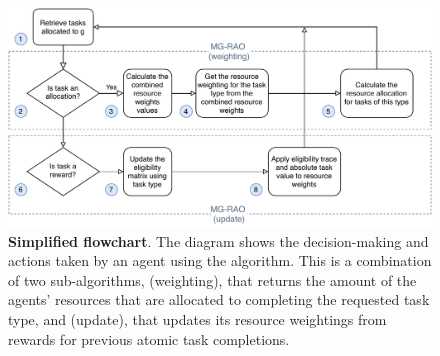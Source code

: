 \begin{figure}[ht]
	\centering
	\includegraphics[width=0.8\linewidth, trim={55pt 0pt 55pt 0pt, clip}]{mgrao-simplified}
	\caption{\textbf{Simplified \acronymMGRAO{}{} flowchart}. The diagram shows the decision-making and actions taken by an agent using the \acronymMGRAO{}{}  algorithm. This is a combination of two sub-algorithms, \acronymMGRAO{}{}(weighting), that returns the amount of the agents' resources that are allocated to completing the requested task type, and  \acronymMGRAO{}{}(update), that updates its resource weightings from rewards for previous atomic task completions.}
	\label{fig:mgrao-simplified}
\end{figure}
